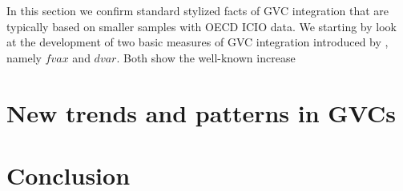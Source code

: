 \documentclass[11pt,a4paper]{article}
\begin{document}
In this section we confirm standard stylized facts of GVC integration that are typically based on smaller samples with OECD ICIO data. We starting by look at the development of two basic measures of GVC integration introduced by \citet{dahuetal01}, namely $fvax$ and $dvar$. Both show the well-known increase 


\section{New trends and patterns in GVCs}\label{sec:news}



\section{Conclusion}\label{sec:conclusion}

\clearpage




\clearpage
\end{document}
